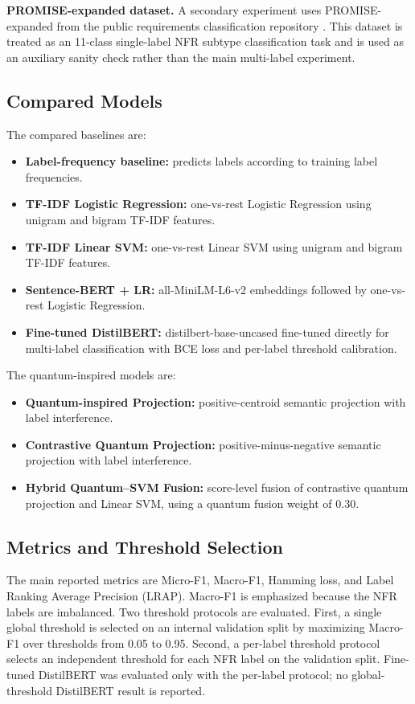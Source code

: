 \documentclass[runningheads]{llncs}
\begin{document}
\textbf{PROMISE-expanded dataset.} A secondary experiment uses
PROMISE-expanded from the public requirements classification repository
\cite{mitrevski_promise_exp}. This dataset is treated as an 11-class
single-label NFR subtype classification task and is used as an auxiliary sanity
check rather than the main multi-label experiment.

\subsection{Compared Models}
The compared baselines are:
\begin{itemize}
    \item \textbf{Label-frequency baseline:} predicts labels according to training label frequencies.
    \item \textbf{TF-IDF Logistic Regression:} one-vs-rest Logistic Regression using unigram and bigram TF-IDF features.
    \item \textbf{TF-IDF Linear SVM:} one-vs-rest Linear SVM using unigram and bigram TF-IDF features.
    \item \textbf{Sentence-BERT + LR:} all-MiniLM-L6-v2 embeddings followed by one-vs-rest Logistic Regression.
    \item \textbf{Fine-tuned DistilBERT:} distilbert-base-uncased fine-tuned directly for multi-label classification with BCE loss and per-label threshold calibration.
\end{itemize}

The quantum-inspired models are:
\begin{itemize}
    \item \textbf{Quantum-inspired Projection:} positive-centroid semantic projection with label interference.
    \item \textbf{Contrastive Quantum Projection:} positive-minus-negative semantic projection with label interference.
    \item \textbf{Hybrid Quantum--SVM Fusion:} score-level fusion of contrastive quantum projection and Linear SVM, using a quantum fusion weight of 0.30.
\end{itemize}

\subsection{Metrics and Threshold Selection}
The main reported metrics are Micro-F1, Macro-F1, Hamming loss, and Label
Ranking Average Precision (LRAP). Macro-F1 is emphasized because the NFR labels
are imbalanced. Two threshold protocols are evaluated. First, a single global
threshold is selected on an internal validation split by maximizing Macro-F1
over thresholds from 0.05 to 0.95. Second, a per-label threshold protocol
selects an independent threshold for each NFR label on the validation split.
Fine-tuned DistilBERT was evaluated only with the per-label protocol; no
global-threshold DistilBERT result is reported.
\end{document}
